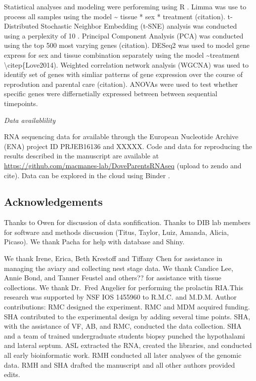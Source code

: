 Statistical analyses and modeling were perforeming using R
\citep{RDevelopmentCoreTeam2013, Wickham2016}. Limma was use to process
all samples using the model \textasciitilde{} tissue * sex * treatment
(citation). t-Distributed Stochastic Neighbor Embedding (t-SNE) analysis
was conducted using a perplexity of 10 \citep{VanDerMaaten2008}.
Principal Component Analysis (PCA) was conducted using the top 500 most
varying genes (citation). DESeq2 was used to model gene express for sex
and tissue combination separately using the model
\textasciitilde{}treatment \textbackslash{}citep\{Love2014). Weighted
correlation network analysis (WGCNA) was used to identify set of genes
with simliar patterns of gene expression over the course of reprodution
and parental care (citation). ANOVAs were used to test whether specific
genes were differnetially expressed between between sequential
timepoints.

\emph{Data availablility}

RNA sequencing data for available through the European Nucleotide
Archive (ENA) project ID PRJEB16136 and XXXXX. Code and data for
reproducing the results described in the manuscript are available at
\url{https://github.com/macmanes-lab/DoveParentsRNAseq} (upload to zendo
and cite). Data can be explored in the cloud using Binder
\citep{project_jupyter-proc-scipy-2018}.

\hypertarget{acknowledgements}{%
\subsection{Acknowledgements}\label{acknowledgements}}

Thanks to Owen for discussion of data sonfification. Thanks to DIB lab
members for software and methods discussion (Titus, Taylor, Luiz,
Amanda, Alicia, Picaso). We thank Pacha for help with database and
Shiny.

We thank Irene, Erica, Beth Krestoff and Tiffany Chen for assistance in
managing the aviary and collecting nest stage data. We thank Candice
Lee, Annie Bond, and Tanner Feustel and others?? for assistance with
tissue collections. We thank Dr.~Fred Angelier for performing the
prolactin RIA.This research was supported by NSF IOS 1455960 to R.M.C.
and M.D.M. Author contributions: RMC designed the experiment. RMC and
MDM acquired funding. SHA contributed to the experimental design by
adding several time points. SHA, with the assistance of VF, AB, and RMC,
conducted the data collection. SHA and a team of trained undergraduate
students biopsy punched the hypothalami and lateral septum. ASL
extracted the RNA, created the libraries, and conducted all early
bioinformatic work. RMH conducted all later analyses of the genomic
data. RMH and SHA drafted the manuscript and all other authors provided
edits.

